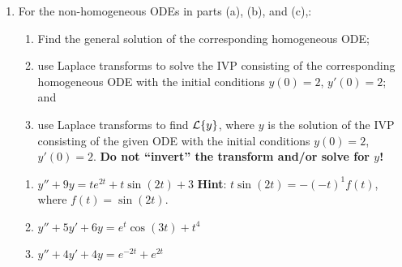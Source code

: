 \documentclass[12pt]{article}
\theoremstyle{definition}
\theoremstyle{underl}
\newcommand{\hintbf}[1]{\textbf{Hint}: #1}
\begin{document}
	\begin{enumerate}[topsep=0.125in,itemsep=0.375in]
		\item For the non-homogeneous ODEs in parts (a), (b), and (c),:
		\begin{enumerate}[label=(\roman*),leftmargin=0.55in,rightmargin=0.55in,topsep=0mm,itemsep=1.5mm] 
			\item Find the general solution of the corresponding homogeneous ODE; 
			\item use Laplace transforms to solve the IVP consisting of the corresponding homogeneous ODE with the initial conditions $y(0)=2$, $y'(0)=2$; and 
			\item use Laplace transforms to find $\mathcal{L}\{y\}$, where $y$ is the solution of the IVP consisting of the given ODE with the initial conditions $y(0)=2$, $y'(0)=2$. \textbf{Do not ``invert'' the transform and/or solve for $y$!}
		\end{enumerate}
			\begin{enumerate}[itemsep=3mm]
				\item $y''+9y=te^{2t}+t\sin(2t)+3$ \hspace{6mm}\hintbf{$t\sin(2t)=-(-t)^1f(t)$, where $f(t)=\sin(2t)$.}
				\item $y''+5y'+6y=e^t\cos(3t)+t^4$
				\item $y''+4y'+4y=e^{-2t}+e^{2t}$
			\end{enumerate}
	

\end{enumerate}
\end{document}
